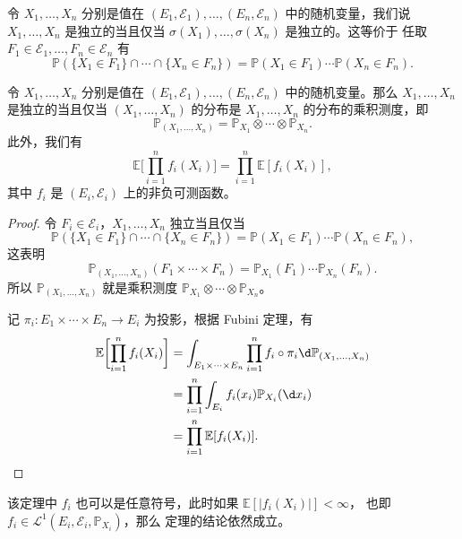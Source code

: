 \documentclass[fontset=none]{Notes}
\begin{document}
令 $X_1,\dots,X_n$ 分别是值在 $(E_1,\mathcal{E}_1),\dots,(E_n,\mathcal{E}_n)$
中的随机变量，我们说 $X_1,\dots,X_n$ 是独立的当且仅当
$\sigma(X_1),\dots,\sigma(X_n)$ 是独立的。这等价于
任取 $F_1\in \mathcal{E}_1,\dots,F_n\in \mathcal{E}_n$ 有
\[
  \mathbb{P}(\{X_1\in F_1\}\cap\cdots\cap\{X_n\in F_n\})  
  =\mathbb{P}(X_1\in F_1)\cdots \mathbb{P}(X_n\in F_n).
\]

\begin{theorem}
  令 $X_1,\dots,X_n$ 分别是值在 $(E_1,\mathcal{E}_1),\dots,(E_n,\mathcal{E}_n)$
  中的随机变量。那么 $X_1,\dots,X_n$ 是独立的当且仅当 $(X_1,\dots,X_n)$
  的分布是 $X_1,\dots,X_n$ 的分布的乘积测度，即
  \[
    \mathbb{P}_{(X_1,\dots,X_n)}=\mathbb{P}_{X_1}\otimes\cdots
    \otimes \mathbb{P}_{X_n}.  
  \]
  此外，我们有
  \[
    \mathbb{E}\biggl[\prod_{i=1}^n f_i(X_i)\biggr] =\prod_{i=1}^n \mathbb{E}[f_i(X_i)],
  \]
  其中 $f_i$ 是 $(E_i,\mathcal{E}_i)$ 上的非负可测函数。
\end{theorem}
\begin{proof}
  令 $F_i\in \mathcal{E}_i$，$X_1,\dots,X_n$ 独立当且仅当
  \[
    \mathbb{P}(\{X_1\in F_1\}\cap\cdots\cap\{X_n\in F_n\})  
    =\mathbb{P}(X_1\in F_1)\cdots \mathbb{P}(X_n\in F_n),
  \]
  这表明
  \[ 
    \mathbb{P}_{(X_1,\dots,X_n)}(F_1\times\cdots\times F_n)
    =\mathbb{P}_{X_1}(F_1)\cdots \mathbb{P}_{X_n}(F_n).
  \]
  所以 $\mathbb{P}_{(X_1,\dots,X_n)}$ 就是乘积测度 
  $\mathbb{P}_{X_1}\otimes\cdots\otimes \mathbb{P}_{X_n}$。

  记 $\pi_i:E_1\times \cdots\times E_n\to E_i$ 为投影，根据 Fubini 定理，有
  \begin{align*}
    \mathbb{E}\biggl[\prod_{i=1}^n f_i(X_i)\biggr]&=
    \int_{E_1\times\cdots \times E_n}\prod_{i=1}^n f_i\circ\pi_i
    \d\mathbb{P}_{(X_1,\dots,X_n)}\\
    &=\prod_{i=1}^n \int_{E_i} f_i(x_i) \mathbb{P}_{X_i}(\d x_i)\\
    &=\prod_{i=1}^n \mathbb{E}[f_i(X_i)].\qedhere
  \end{align*}
\end{proof}
\begin{remark}
  该定理中 $f_i$ 也可以是任意符号，此时如果 $\mathbb{E}[|f_i(X_i)|]<\infty$，
  也即 $f_i\in \mathcal{L}^1(E_i,\mathcal{E}_i,\mathbb{P}_{X_i})$，那么
  定理的结论依然成立。
\end{remark}
\end{document}
